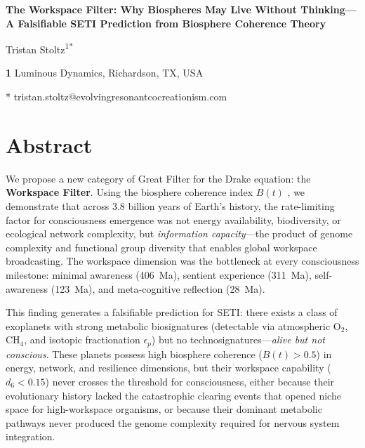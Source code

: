 \documentclass[10pt,letterpaper]{article}
\newcommand{\bt}{$B(t)$}
\begin{document}
\vspace*{0.2in}

\begin{flushleft}
{\Large\textbf{The Workspace Filter: Why Biospheres May Live Without Thinking---A Falsifiable SETI Prediction from Biosphere Coherence Theory}}
\bigskip

Tristan Stoltz\textsuperscript{1*}

\bigskip

\textbf{1} Luminous Dynamics, Richardson, TX, USA

\bigskip

* tristan.stoltz@evolvingresonantcocreationism.com

\end{flushleft}

\section*{Abstract}

We propose a new category of Great Filter for the Drake equation:
the \textbf{Workspace Filter}. Using the biosphere coherence index \bt{}
\cite{stoltz2026bt}, we demonstrate that across 3.8 billion years of
Earth's history, the rate-limiting factor for consciousness emergence
was not energy availability, biodiversity, or ecological network
complexity, but \emph{information capacity}---the product of genome
complexity and functional group diversity that enables global workspace
broadcasting. The workspace dimension was the bottleneck at every
consciousness milestone: minimal awareness (406~Ma), sentient experience
(311~Ma), self-awareness (123~Ma), and meta-cognitive reflection (28~Ma).

This finding generates a falsifiable prediction for SETI: there exists
a class of exoplanets with strong metabolic biosignatures (detectable
via atmospheric $\text{O}_2$, $\text{CH}_4$, and isotopic fractionation
$\epsilon_p$) but no technosignatures---\emph{alive but not conscious}.
These planets possess high biosphere coherence ($B(t) > 0.5$) in energy,
network, and resilience dimensions, but their workspace capability
($d_6 < 0.15$) never crosses the threshold for consciousness, either
because their evolutionary history lacked the catastrophic clearing events
that opened niche space for high-workspace organisms, or because their
dominant metabolic pathways never produced the genome complexity required
for nervous system integration.
\end{document}
